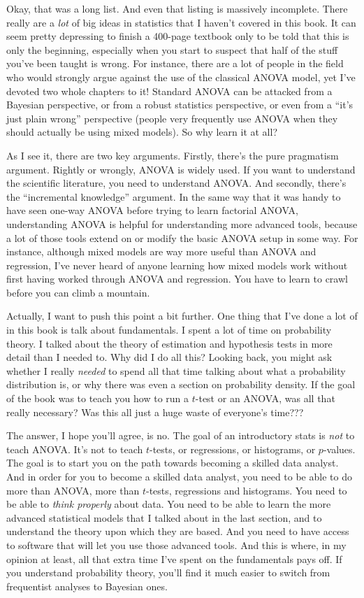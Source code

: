 Okay, that was a long list. And even that listing is massively incomplete. There really are a {\it lot} of big ideas in statistics that I haven't covered in this book. It can seem pretty depressing to finish a 400-page textbook only to be told that this is only the beginning, especially when you start to suspect that half of the stuff you've been taught is wrong. For instance, there are a lot of people in the field who would strongly argue against the use of the classical ANOVA model, yet I've devoted two whole chapters to it! Standard ANOVA can be attacked from a Bayesian perspective, or from a robust statistics perspective, or even from a ``it's just plain wrong'' perspective (people very frequently use ANOVA when they should actually be using mixed models). So why learn it at all? 

As I see it, there are two key arguments. Firstly, there's the pure pragmatism argument. Rightly or wrongly, ANOVA is widely used. If you want to understand the scientific literature, you need to understand ANOVA. And secondly, there's the ``incremental knowledge'' argument. In the same way that it was handy to have seen one-way ANOVA before trying to learn factorial ANOVA, understanding ANOVA is helpful for understanding more advanced tools, because a lot of those tools extend on or modify the basic ANOVA setup in some way. For instance, although mixed models are way more useful than ANOVA and regression, I've never heard of anyone learning how mixed models work without first having worked through ANOVA and regression. You have to learn to crawl before you can climb a mountain.

Actually, I want to push this point a bit further. One thing that I've done a lot of in this book is talk about fundamentals. I spent a lot of time on probability theory. I talked about the theory of estimation and hypothesis tests in more detail than I needed to. Why did I do all this? Looking back, you might ask whether I really {\it needed} to spend all that time talking about what a probability distribution is, or why there was even a section on probability density. If the goal of the book was to teach you how to run a $t$-test or an ANOVA, was all that really necessary? Was this all just a huge waste of everyone's time???

The answer, I hope you'll agree, is no. The goal of an introductory stats is {\it not} to teach ANOVA. It's not to teach $t$-tests, or regressions, or histograms, or $p$-values. The goal is to start you on the path towards becoming a skilled data analyst. And in order for you to become a skilled data analyst, you need to be able to do more than ANOVA, more than $t$-tests, regressions and histograms. You need to be able to {\it think properly} about data. You need to be able to learn the more advanced statistical models that I talked about in the last section, and to understand the theory upon which they are based. And you need to have access to software that will let you use those advanced tools. And this is where, in my opinion at least, all that extra time I've spent on the fundamentals pays off. If you understand probability theory, you'll find it much easier to switch from frequentist analyses to Bayesian ones. 

